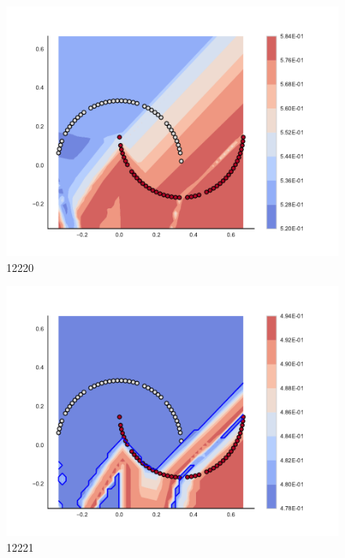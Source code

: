 \begin{subfigure}[b]{0.09\textwidth}
    \includegraphics[clip, trim=2.35cm 1.75cm 4.5cm 0cm,width=\textwidth]{img/convergence/12220.pdf}
    \caption{12220}
    \label{fig:convergence_12220}
\end{subfigure}
%
\begin{subfigure}[b]{0.09\textwidth}
    \includegraphics[clip, trim=2.35cm 1.75cm 4.5cm 0cm,width=\textwidth]{img/convergence/12221.pdf}
    \caption{12221}
    \label{fig:convergence_12221}
\end{subfigure}
%
